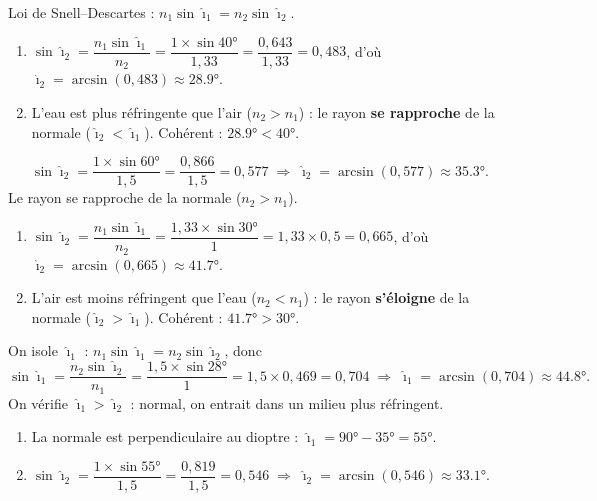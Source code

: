 \documentclass[11pt,a4paper]{article}
\begin{document}
\begin{corrige}
Loi de Snell–Descartes : $n_1\sin\hat{\imath}_1=n_2\sin\hat{\imath}_2$.
\begin{enumerate}[label=\alph*)]
  \item $\sin\hat{\imath}_2=\dfrac{n_1\sin\hat{\imath}_1}{n_2}=\dfrac{1\times\sin\ang{40}}{1{,}33}
        =\dfrac{0{,}643}{1{,}33}=0{,}483$, d'où $\hat{\imath}_2=\arcsin(0{,}483)\approx\ang{28.9}$.
  \item L'eau est plus réfringente que l'air ($n_2>n_1$) : le rayon \textbf{se rapproche} de la
        normale ($\hat{\imath}_2<\hat{\imath}_1$). Cohérent : $\ang{28.9}<\ang{40}$.
\end{enumerate}
\end{corrige}

\begin{corrige}
\[ \sin\hat{\imath}_2=\frac{1\times\sin\ang{60}}{1{,}5}=\frac{0{,}866}{1{,}5}=0{,}577
   \;\Rightarrow\;\hat{\imath}_2=\arcsin(0{,}577)\approx\ang{35.3}. \]
Le rayon se rapproche de la normale ($n_2>n_1$).
\end{corrige}

\begin{corrige}
\begin{enumerate}[label=\alph*)]
  \item $\sin\hat{\imath}_2=\dfrac{n_1\sin\hat{\imath}_1}{n_2}=\dfrac{1{,}33\times\sin\ang{30}}{1}
        =1{,}33\times0{,}5=0{,}665$, d'où $\hat{\imath}_2=\arcsin(0{,}665)\approx\ang{41.7}$.
  \item L'air est moins réfringent que l'eau ($n_2<n_1$) : le rayon \textbf{s'éloigne} de la normale
        ($\hat{\imath}_2>\hat{\imath}_1$). Cohérent : $\ang{41.7}>\ang{30}$.
\end{enumerate}
\end{corrige}

\begin{corrige}
On isole $\hat{\imath}_1$ : $n_1\sin\hat{\imath}_1=n_2\sin\hat{\imath}_2$, donc
\[ \sin\hat{\imath}_1=\frac{n_2\sin\hat{\imath}_2}{n_1}=\frac{1{,}5\times\sin\ang{28}}{1}
   =1{,}5\times0{,}469=0{,}704 \;\Rightarrow\;\hat{\imath}_1=\arcsin(0{,}704)\approx\ang{44.8}. \]
On vérifie $\hat{\imath}_1>\hat{\imath}_2$ : normal, on entrait dans un milieu plus réfringent.
\end{corrige}

\begin{corrige}
\begin{enumerate}[label=\alph*)]
  \item La normale est perpendiculaire au dioptre : $\hat{\imath}_1=\ang{90}-\ang{35}=\ang{55}$.
  \item $\sin\hat{\imath}_2=\dfrac{1\times\sin\ang{55}}{1{,}5}=\dfrac{0{,}819}{1{,}5}=0{,}546
        \;\Rightarrow\;\hat{\imath}_2=\arcsin(0{,}546)\approx\ang{33.1}$.
\end{enumerate}
\end{corrige}
\end{document}
